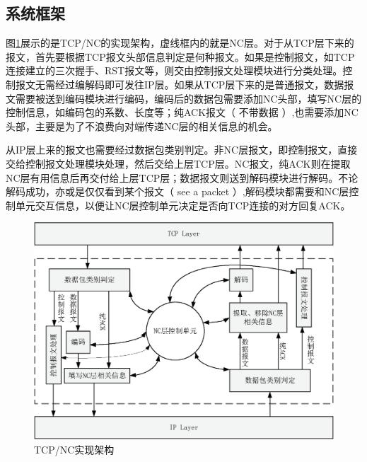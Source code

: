 \subsection{系统框架}
图\ref{JIAGOU_EPS}展示的是TCP/NC的实现架构，虚线框内的就是NC层。对于从TCP层下来的报文，首先要根据TCP报文头部信息判定是何种报文。如果是控制报文，如TCP连接建立的三次握手、RST报文等，则交由控制报文处理模块进行分类处理。控制报文无需经过编解码即可发往IP层。如果从TCP层下来的是普通报文，数据报文需要被送到编码模块进行编码，编码后的数据包需要添加NC头部，填写NC层的控制信息，如编码包的系数、长度等；纯ACK报文（ 不带数据 ）,也需要添加NC头部，主要是为了不浪费向对端传递NC层的相关信息的机会。
\par
从IP层上来的报文也需要经过数据包类别判定。非NC层报文，即控制报文，直接交给控制报文处理模块处理，然后交给上层TCP层。NC报文，纯ACK则在提取NC层有用信息后再交付给上层TCP层；数据报文则送到解码模块进行解码。不论解码成功，亦或是仅仅看到某个报文（ see a packet ）,解码模块都需要和NC层控制单元交互信息，以便让NC层控制单元决定是否向TCP连接的对方回复ACK。
\begin{figure}[htbp]
	\centering
	\includegraphics[width=5in]{figures/jiagou.eps}
	\caption{TCP/NC实现架构}
	\label{JIAGOU_EPS}
\end{figure}

